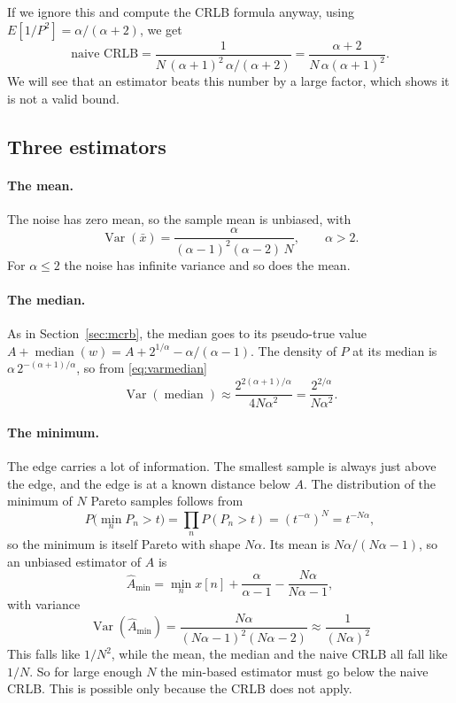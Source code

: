 \documentclass[11pt]{article}
\numberwithin{figure}{section}
\numberwithin{equation}{section}
\begin{document}
If we ignore this and compute the CRLB formula anyway, using $E[1/P^2] = \alpha/(\alpha+2)$, we get
\[
  \text{naive CRLB} = \frac{1}{N\,(\alpha+1)^2\,\alpha/(\alpha+2)} = \frac{\alpha + 2}{N\,\alpha(\alpha+1)^2}.
\]
We will see that an estimator beats this number by a large factor, which shows it is not a valid bound.

\subsection{Three estimators}

\paragraph{The mean.} The noise has zero mean, so the sample mean is unbiased, with
\[
  \operatorname{Var}(\bar x) = \frac{\alpha}{(\alpha-1)^2(\alpha-2)\,N}, \qquad \alpha > 2 .
\]
For $\alpha \leq 2$ the noise has infinite variance and so does the mean.

\paragraph{The median.} As in Section~\ref{sec:mcrb}, the median goes to its pseudo-true value
$A + \operatorname{median}(w) = A + 2^{1/\alpha} - \alpha/(\alpha-1)$. The density of $P$ at its median is
$\alpha\,2^{-(\alpha+1)/\alpha}$, so from \eqref{eq:varmedian}
\[
  \operatorname{Var}(\operatorname{median}) \approx \frac{2^{2(\alpha+1)/\alpha}}{4N\alpha^2} = \frac{2^{2/\alpha}}{N\alpha^2}.
\]

\paragraph{The minimum.} The edge carries a lot of information. The smallest sample is always just
above the edge, and the edge is at a known distance below $A$. The distribution of the minimum of
$N$ Pareto samples follows from
\[
  P\Big(\min_n P_n > t\Big) = \prod_{n} P(P_n > t) = \left(t^{-\alpha}\right)^N = t^{-N\alpha},
\]
so the minimum is itself Pareto with shape $N\alpha$. Its mean is $N\alpha/(N\alpha - 1)$, so an
unbiased estimator of $A$ is
\[
  \hat A_{\min} = \min_n x[n] + \frac{\alpha}{\alpha - 1} - \frac{N\alpha}{N\alpha - 1},
\]
with variance
\[
  \boxed{\operatorname{Var}(\hat A_{\min}) = \frac{N\alpha}{(N\alpha - 1)^2 (N\alpha - 2)} \approx \frac{1}{(N\alpha)^2}}
\]
This falls like $1/N^2$, while the mean, the median and the naive CRLB all fall like $1/N$. So for
large enough $N$ the min-based estimator must go below the naive CRLB. This is possible only
because the CRLB does not apply.
\end{document}
